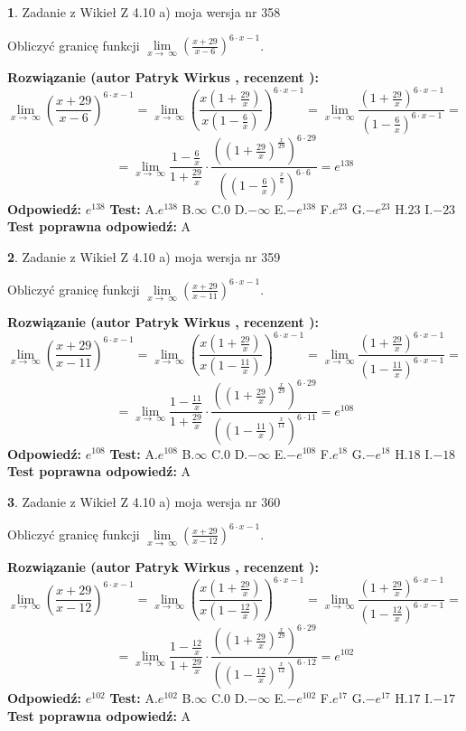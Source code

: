 \documentclass[12pt, a4paper]{article}
\theoremstyle{definition} %
\newtheorem{zad}{}
\newcommand{\zadStart}[1]{\begin{zad}#1\newline}
\newcommand{\zadStop}{\end{zad}}
\newcommand{\rozwStart}[2]{\noindent \textbf{Rozwiązanie (autor #1 , recenzent #2): }\newline}
\newcommand{\rozwStop}{\newline}
\newcommand{\odpStart}{\noindent \textbf{Odpowiedź:}\newline}
\newcommand{\odpStop}{\newline}
\newcommand{\testStart}{\noindent \textbf{Test:}\newline}
\newcommand{\testStop}{\newline}
\newcommand{\kluczStart}{\noindent \textbf{Test poprawna odpowiedź:}\newline}
\newcommand{\kluczStop}{\newline}
\begin{document}
\zadStart{Zadanie z Wikieł Z 4.10 a) moja wersja nr 358}

Obliczyć granicę funkcji  $\lim\limits_{x\to\ \infty}(\frac{x+29}{x-6})^{6\cdot x-1}$.
\zadStop
\rozwStart{Patryk Wirkus}{}
$$\lim\limits_{x\to\ \infty}(\frac{x+29}{x-6})^{6\cdot x-1} = \lim\limits_{x\to\ \infty}(\frac{x(1+\frac{29}{x})}{x(1-\frac{6}{x})})^{6\cdot x-1}=\lim\limits_{x\to\ \infty}\frac{(1+\frac{29}{x})^{6\cdot x-1}}{(1-\frac{6}{x})^{6\cdot x-1}}=$$
$$=\lim\limits_{x\to\ \infty}\frac{1-\frac{6}{x}}{1+\frac{29}{x}}\cdot\frac{((1+\frac{29}{x})^{\frac{x}{29}})^{6\cdot29}}{((1-\frac{6}{x})^{\frac{x}{6}})^{6\cdot6}}=e^{138}$$
\rozwStop
\odpStart
$e^{138}$
\odpStop
\testStart
A.$e^{138}$ B.$\infty$ C.$0$ D.$-\infty$ E.$-e^{138}$
F.$e^{23}$ G.$-e^{23}$
H.$23$
I.$-23$
\testStop
\kluczStart
A
\kluczStop



\zadStart{Zadanie z Wikieł Z 4.10 a) moja wersja nr 359}

Obliczyć granicę funkcji  $\lim\limits_{x\to\ \infty}(\frac{x+29}{x-11})^{6\cdot x-1}$.
\zadStop
\rozwStart{Patryk Wirkus}{}
$$\lim\limits_{x\to\ \infty}(\frac{x+29}{x-11})^{6\cdot x-1} = \lim\limits_{x\to\ \infty}(\frac{x(1+\frac{29}{x})}{x(1-\frac{11}{x})})^{6\cdot x-1}=\lim\limits_{x\to\ \infty}\frac{(1+\frac{29}{x})^{6\cdot x-1}}{(1-\frac{11}{x})^{6\cdot x-1}}=$$
$$=\lim\limits_{x\to\ \infty}\frac{1-\frac{11}{x}}{1+\frac{29}{x}}\cdot\frac{((1+\frac{29}{x})^{\frac{x}{29}})^{6\cdot29}}{((1-\frac{11}{x})^{\frac{x}{11}})^{6\cdot11}}=e^{108}$$
\rozwStop
\odpStart
$e^{108}$
\odpStop
\testStart
A.$e^{108}$ B.$\infty$ C.$0$ D.$-\infty$ E.$-e^{108}$
F.$e^{18}$ G.$-e^{18}$
H.$18$
I.$-18$
\testStop
\kluczStart
A
\kluczStop



\zadStart{Zadanie z Wikieł Z 4.10 a) moja wersja nr 360}

Obliczyć granicę funkcji  $\lim\limits_{x\to\ \infty}(\frac{x+29}{x-12})^{6\cdot x-1}$.
\zadStop
\rozwStart{Patryk Wirkus}{}
$$\lim\limits_{x\to\ \infty}(\frac{x+29}{x-12})^{6\cdot x-1} = \lim\limits_{x\to\ \infty}(\frac{x(1+\frac{29}{x})}{x(1-\frac{12}{x})})^{6\cdot x-1}=\lim\limits_{x\to\ \infty}\frac{(1+\frac{29}{x})^{6\cdot x-1}}{(1-\frac{12}{x})^{6\cdot x-1}}=$$
$$=\lim\limits_{x\to\ \infty}\frac{1-\frac{12}{x}}{1+\frac{29}{x}}\cdot\frac{((1+\frac{29}{x})^{\frac{x}{29}})^{6\cdot29}}{((1-\frac{12}{x})^{\frac{x}{12}})^{6\cdot12}}=e^{102}$$
\rozwStop
\odpStart
$e^{102}$
\odpStop
\testStart
A.$e^{102}$ B.$\infty$ C.$0$ D.$-\infty$ E.$-e^{102}$
F.$e^{17}$ G.$-e^{17}$
H.$17$
I.$-17$
\testStop
\kluczStart
A
\kluczStop
\end{document}

